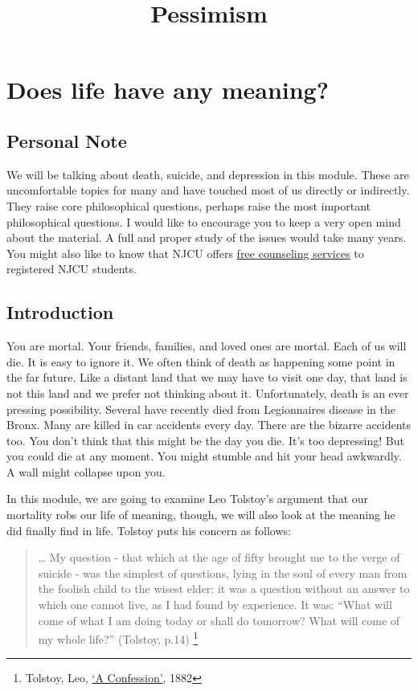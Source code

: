 \documentclass[]{article}
\title{Pessimism}
\date{}
\begin{document}
\maketitle

\section{Does life have any meaning?}\label{does-life-have-any-meaning}

\subsection{Personal Note}\label{personal-note}

We will be talking about death, suicide, and depression in this module.
These are uncomfortable topics for many and have touched most of us
directly or indirectly. They raise core philosophical questions, perhaps
raise the most important philosophical questions. I would like to
encourage you to keep a very open mind about the material. A full and
proper study of the issues would take many years. You might also like to
know that NJCU offers \href{http://www.njcu.edu/counselingcenter}{free
counseling services} to registered NJCU students.

\subsection{Introduction}\label{introduction}

You are mortal. Your friends, families, and loved ones are mortal. Each
of us will die. It is easy to ignore it. We often think of death as
happening some point in the far future. Like a distant land that we may
have to visit one day, that land is not this land and we prefer not
thinking about it. Unfortunately, death is an ever pressing possibility.
Several have recently died from Legionnaires disease in the Bronx. Many
are killed in car accidents every day. There are the bizarre accidents
too. You don't think that this might be the day you die. It's too
depressing! But you could die at any moment. You might stumble and hit
your head awkwardly. A wall might collapse upon you.

In this module, we are going to examine Leo Tolstoy's argument that our
mortality robs our life of meaning, though, we will also look at the
meaning he did finally find in life. Tolstoy puts his concern as
follows:

\begin{quote}
\ldots{} My question - that which at the age of fifty brought me to the
verge of suicide - was the simplest of questions, lying in the soul of
every man from the foolish child to the wisest elder: it was a question
without an answer to which one cannot live, as I had found by
experience. It was: ``What will come of what I am doing today or shall
do tomorrow? What will come of my whole life?'' (Tolstoy, p.14)
\footnote{Tolstoy, Leo, \href{/Teaching/Examined/Meaning/Tolstoy.pdf}{`A
  Confession'}, 1882}
\end{quote}
\end{document}
